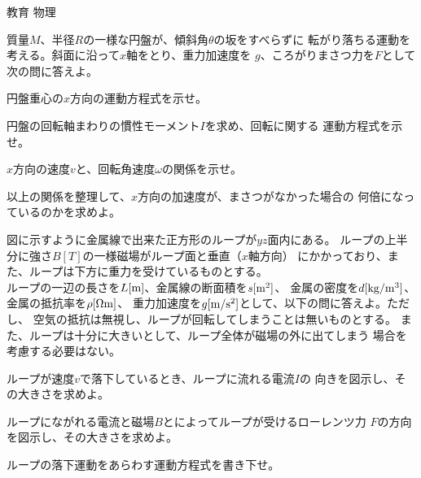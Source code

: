 \documentclass[fleqn]{jbook}
\begin{document}
\begin{question}{教育 物理}{}


\begin{subquestions}
\SubQuestion
  質量$M$、半径$R$の一様な円盤が、傾斜角$\theta$の坂をすべらずに
  転がり落ちる運動を考える。斜面に沿って$x$軸をとり、重力加速度を
  $g$、ころがりまさつ力を$F$として次の問に答えよ。

  \begin{subsubquestions}
  \SubSubQuestion
    円盤重心の$x$方向の運動方程式を示せ。

  \SubSubQuestion
    円盤の回転軸まわりの慣性モーメント$I$を求め、回転に関する
    運動方程式を示せ。

  \SubSubQuestion
    $x$方向の速度$v$と、回転角速度$\omega$の関係を示せ。

  \SubSubQuestion
    以上の関係を整理して、$x$方向の加速度が、まさつがなかった場合の
    何倍になっているのかを求めよ。

  \end{subsubquestions}


\SubQuestion
  図に示すように金属線で出来た正方形のループが$yz$面内にある。
  ループの上半分に強さ$B[T]$の一様磁場がループ面と垂直（$x$軸方向）
  にかかっており、また、ループは下方に重力を受けているものとする。\\
%
  ループの一辺の長さを$L[{\rm m}]$、金属線の断面積を$s[{\rm m^2}]$、
  金属の密度を$d[{\rm kg/m^3]}$、金属の抵抗率を$\rho[{\rm \Omega m}]$、
  重力加速度を$g[{\rm m/s^2}]$として、以下の問に答えよ。ただし、
  空気の抵抗は無視し、ループが回転してしまうことは無いものとする。
  また、ループは十分に大きいとして、ループ全体が磁場の外に出てしまう
  場合を考慮する必要はない。\vspace*{-4mm}

  \parbox[t]{100mm}{
  \begin{subsubquestions}
  \SubSubQuestion
    ループが速度$v$で落下しているとき、ループに流れる電流$I$の
    向きを図示し、その大きさを求めよ。

  \SubSubQuestion
    ループにながれる電流と磁場$B$とによってループが受けるローレンツ力
    $F$の方向を図示し、その大きさを求めよ。

  \SubSubQuestion
    ループの落下運動をあらわす運動方程式を書き下せ。
 

\end{subsubquestions}}
\end{subquestions}
\end{question}
\end{document}
